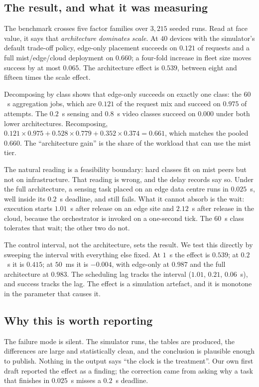 \documentclass[journal,10pt]{IEEEtran}
\begin{document}
\subsection{The result, and what it was measuring}
The benchmark crosses five factor families over $3{,}215$ seeded runs. Read at face
value, it says that \emph{architecture dominates scale}. At $40$ devices with
the simulator's default trade-off policy, edge-only placement succeeds on
$0.121$ of requests and a full mist/edge/cloud deployment on $0.660$; a
four-fold increase in fleet size moves success by at most $0.065$. The
architecture effect is $0.539$, between eight and fifteen times the scale
effect.

Decomposing by class shows that edge-only succeeds on exactly one class: the
$60$~s aggregation jobs, which are $0.121$ of the request mix and succeed on
$0.975$ of attempts. The $0.2$~s sensing and $0.8$~s video classes succeed on
$0.000$ under both lower architectures. Recomposing,
$0.121\times0.975+0.528\times0.779+0.352\times0.374=0.661$, which matches the
pooled $0.660$. The ``architecture gain'' is the share of the workload that can
use the mist tier.

The natural reading is a feasibility boundary: hard classes fit on mist peers
but not on infrastructure. That reading is wrong, and the delay records say so.
Under the full architecture, a sensing task placed on an edge data centre runs
in $0.025$~s, well inside its $0.2$~s deadline, and still fails. What it cannot
absorb is the wait: execution starts $1.01$~s after release on an edge site and
$2.12$~s after release in the cloud, because the orchestrator is invoked on a
one-second tick. The $60$~s class tolerates that wait; the other two do not.

The control interval, not the architecture, sets the result. We test this
directly by sweeping the interval with everything else fixed. At $1$~s the
effect is $0.539$; at $0.2$~s it is $0.415$; at $50$~ms it is $-0.004$, with
edge-only at $0.987$ and the full architecture at $0.983$. The scheduling lag
tracks the interval ($1.01$, $0.21$, $0.06$~s), and success tracks the lag.
The effect is a simulation artefact, and it is monotone in the parameter that
causes it.

\subsection{Why this is worth reporting}
The failure mode is silent. The simulator runs, the tables are produced, the
differences are large and statistically clean, and the conclusion is plausible
enough to publish. Nothing in the output says ``the clock is the treatment''.
Our own first draft reported the effect as a finding; the correction came from
asking why a task that finishes in $0.025$~s misses a $0.2$~s deadline.
\end{document}
